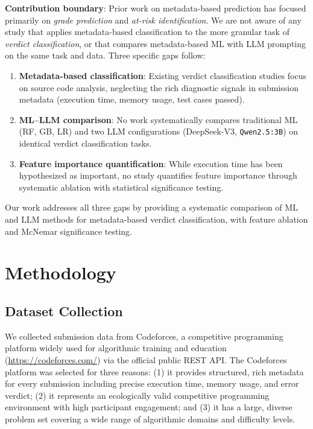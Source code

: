 \documentclass[acmsmall]{acmart}
\begin{document}
 

\par\textbf{Contribution boundary}: Prior work on metadata-based prediction has focused primarily on \textit{grade prediction} and \textit{at-risk identification}. We are not aware of any study that applies metadata-based classification to the more granular task of \textit{verdict classification}, or that compares metadata-based ML with LLM prompting on the same task and data. Three specific gaps follow:

\begin{enumerate}
 \item \textbf{Metadata-based classification}: Existing verdict classification
 studies focus on source code analysis, neglecting the rich diagnostic
 signals in submission metadata (execution time, memory usage, test cases
 passed).
 \item \textbf{ML--LLM comparison}: No work systematically compares traditional
 ML (RF, GB, LR) and two LLM configurations (DeepSeek-V3, \texttt{Qwen2.5:3B})
 on identical verdict classification tasks.
 \item \textbf{Feature importance quantification}: While execution time has been
 hypothesized as important, no study quantifies feature importance through
 systematic ablation with statistical significance testing.
\end{enumerate}

Our work addresses all three gaps by providing a systematic comparison
of ML and LLM methods for metadata-based verdict classification, with
feature ablation and McNemar significance testing.

\section{Methodology}

\subsection{Dataset Collection}

We collected submission data from Codeforces, a competitive programming platform widely used for algorithmic training and education~\cite{mirzayanov2020codeforces,zhang2022automated} (\url{https://codeforces.com/})
via the official public REST API. The Codeforces
platform was selected for three reasons: (1) it provides structured, rich
metadata for every submission including precise execution time, memory usage,
and error verdict; (2) it represents an ecologically valid competitive
programming environment with high participant engagement; and (3) it has a
large, diverse problem set covering a wide range of algorithmic domains and
difficulty levels.
\end{document}
